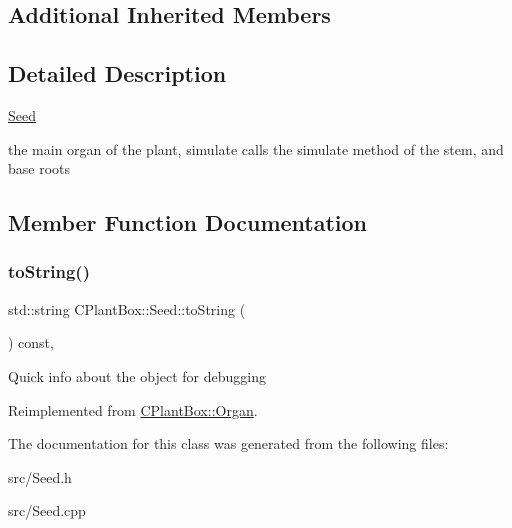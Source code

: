 \subsection*{Additional Inherited Members}


\subsection{Detailed Description}
\hyperlink{classCPlantBox_1_1Seed}{Seed}

the main organ of the plant, simulate calls the simulate method of the stem, and base roots 

\subsection{Member Function Documentation}
\mbox{\label{classCPlantBox_1_1Seed_a83a1493777594b1e92d31d6d3db4258b}} 
\subsubsection{\texorpdfstring{to\+String()}{toString()}}
{\footnotesize\ttfamily std\+::string C\+Plant\+Box\+::\+Seed\+::to\+String (\begin{DoxyParamCaption}{ }\end{DoxyParamCaption}) const\hspace{0.3cm}{\ttfamily [override]}, {\ttfamily [virtual]}}

Quick info about the object for debugging 

Reimplemented from \hyperlink{classCPlantBox_1_1Organ_a9f823aebd19519096e899e65604f239f}{C\+Plant\+Box\+::\+Organ}.



The documentation for this class was generated from the following files\+:\begin{DoxyCompactItemize}
\item 
src/Seed.\+h\item 
src/Seed.\+cpp\end{DoxyCompactItemize}
